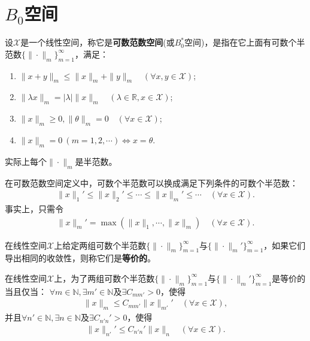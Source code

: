 \documentclass[../../main.tex]{subfiles}%
\begin{document}
\section{$B_0$空间}

\begin{definition}
设$\mathscr{X}$是一个线性空间，称它是\textbf{可数范数空间}(或$B_0^*$空间)，是指在它上面有可数个半范数$\{\|\cdot\|_m\}_{m=1}^\infty$，满足：
\begin{enumerate}[(1)]
\item $\|x+y\|_m\leqslant\|x\|_m+\|y\|_m\quad(\forall x,y\in\mathscr{X})$;
\item $\|\lambda x\|_m=|\lambda|\|x\|_m\quad(\lambda\in\mathbb{R},x\in\mathscr{X})$;
\item $\|x\|_m\geqslant0,\|\theta\|_m=0\quad(\forall x\in\mathscr{X})$;
\item $\|x\|_m=0\ (m=1,2,\cdots)\iff x=\theta$.
\end{enumerate}
\end{definition}
\begin{remark}
实际上每个$\|\cdot\|_m$是半范数。
\end{remark}
\begin{remark}
在可数范数空间定义中，可数个半范数可以换成满足下列条件的可数个半范数：
\begin{align*}
\|x\|_1'\leqslant\|x\|_2'\leqslant\cdots\leqslant\|x\|_m'\leqslant\cdots\quad(\forall x\in\mathscr{X}).
\end{align*}
事实上，只需令
\begin{align*}
\|x\|_m'=\max(\|x\|_1,\cdots,\|x\|_m)\quad(\forall x\in\mathscr{X}).
\end{align*}
\end{remark}

\begin{definition}
在线性空间$\mathscr{X}$上给定两组可数个半范数$\{\|\cdot\|_m\}_{m=1}^\infty$与$\{\|\cdot\|_m'\}_{m=1}^\infty$，如果它们导出相同的收敛性，则称它们是\textbf{等价的}。
\end{definition}

\begin{proposition}
在线性空间$\mathscr{X}$上，为了两组可数个半范数$\{\|\cdot\|_m\}_{m=1}^\infty$与$\{\|\cdot\|_m'\}_{m=1}^\infty$是等价的当且仅当：
$\forall m\in\mathbb{N},\exists m'\in\mathbb{N}$及$\exists C_{mm'}>0$，使得
\begin{align*}
\|x\|_m\leqslant C_{mm'}\|x\|_{m'}'\quad(\forall x\in\mathscr{X}),
\end{align*}
并且$\forall n'\in\mathbb{N},\exists n\in\mathbb{N}$及$\exists C_{n'n}'>0$，使得
\begin{align*}
\|x\|_{n'}'\leqslant C_{n'n}'\|x\|_n\quad(\forall x\in\mathscr{X}).
\end{align*}
\end{proposition}
\end{document}
